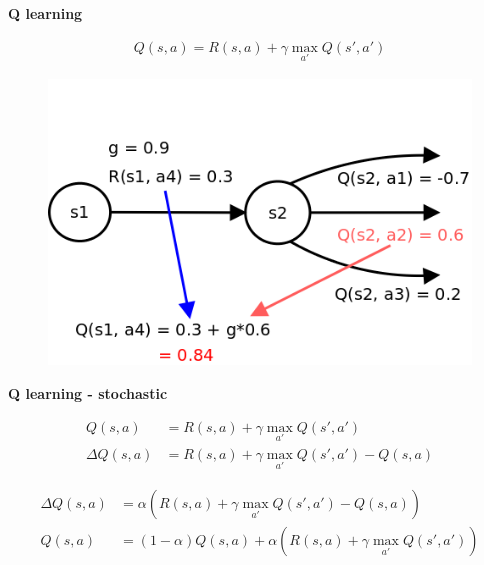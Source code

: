 \documentclass[xcolor=dvipsnames]{beamer}
\begin{document}
\begin{frame}{\bf Q learning}

\begin{align*}
Q(s, a) = R(s, a) + \gamma \max \limits_{a'} Q(s', a')
\end{align*}

\begin{figure}
  \includegraphics[scale=0.3]{../../diagrams/q_learning_detail.png}
\end{figure}

\end{frame}


\begin{frame}{\bf Q learning - stochastic}


\begin{align*}
Q(s, a) &= R(s, a) + \gamma \max \limits_{a'} Q(s', a') \\
\Delta Q(s, a) &= R(s, a) + \gamma \max \limits_{a'} Q(s', a') - Q(s, a)
\end{align*}

\begin{align*}
\Delta Q(s, a) &= \alpha(R(s, a) + \gamma \max \limits_{a'} Q(s', a') - Q(s, a)) \\
Q(s, a) &= (1-\alpha)Q(s, a) + \alpha(R(s, a) + \gamma \max \limits_{a'} Q(s', a'))
\end{align*}

\end{frame}
\end{document}
